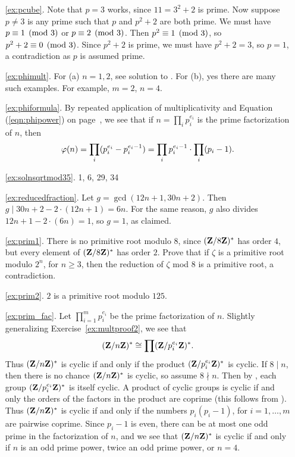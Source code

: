 \begin{itemize}
\begin{enumerate}
\item[\ref{ex:pcube}.]  Note that $p=3$ works, since $11=3^2+2$ is prime.
Now suppose $p\neq 3$ is any prime such that $p$ and $p^2+2$ are both prime.
We must have $p\equiv 1\pmod{3}$ or $p\equiv 2\pmod{3}$.
Then $p^2\equiv 1\pmod{3}$, so $p^2+2\equiv 0\pmod{3}$.
Since $p^2 + 2 $ is prime, we must have $p^2 + 2 = 3$, so $p=1$,
a contradiction as $p$ is assumed prime.

\item[\ref{ex:phimult}.]
For (a) $n=1,2$, see solution to .
For (b), yes there are many such examples.  For example, $m=2$, $n=4$.

\item[\ref{ex:phiformula}.]
By repeated application of multiplicativity and Equation (\ref{eqn:phipower})
on page~\pageref{eqn:phipower}, we see that if $n=\prod_i p_i^{e_i}$
is the prime factorization of $n$, then
$$
   \varphi(n) = \prod_i (p_i^{e_i} - p_i^{e_i-1})
   = \prod_i p_i^{e_i-1} \cdot \prod_i (p_i-1).
$$

\item[\ref{ex:solnsqrtmod35}.] 1, 6, 29, 34

\item[\ref{ex:reducedfraction}.]
Let $g=\gcd(12n+1,30n+2)$.   Then $g\mid 30n+2 - 2\cdot (12n+1) = 6n$.
 For the same reason, $g$ also divides
$12n+1 - 2\cdot (6n) = 1$, so $g=1$, as claimed.

\item[\ref{ex:prim1}.]  There is no primitive
root modulo $8$, since $(\mathbf{Z}/8\mathbf{Z}{})^*$ has order $4$,
but every element of $(\mathbf{Z}/8\mathbf{Z}{})^*$ has order $2$.
Prove that if $\zeta$ is a primitive root modulo $2^n$, for
$n\geq 3$, then the reduction of $\zeta$ mod $8$ is a primitive
root, a contradiction.

\item[\ref{ex:prim2}.] $2$ is a primitive root modulo $125$.


\item[\ref{ex:prim_fac}.] Let $\prod_{i=1}^m p_i^{e_i}$ be the prime
factorization of $n$.  Slightly
generalizing Exercise~\ref{ex:multproof2}, we see that
$$
  (\mathbf{Z}/n\mathbf{Z}{})^* \cong \prod (\mathbf{Z}/p_i^{e_i}\mathbf{Z}{})^*.
$$
Thus $(\mathbf{Z}/n\mathbf{Z}{})^*$ is cyclic if and only if the product
$(\mathbf{Z}/p_i^{e_i}\mathbf{Z}{})^*$ is cyclic.  If $8\mid n$, then
there is no chance $(\mathbf{Z}/n\mathbf{Z}{})^*$ is cyclic, so assume
$8\nmid n$.  Then by ,
each group $(\mathbf{Z}/p_i^{e_i}\mathbf{Z}{})^*$ is itself cyclic.
A product of cyclic groups is cyclic if and only
the orders of the factors in the product are coprime (this
follows from ).
Thus $(\mathbf{Z}/n\mathbf{Z}{})^*$ is cyclic if and only if the numbers
$p_i(p_i-1)$, for $i=1,\ldots, m$ are pairwise coprime.
Since $p_i-1$ is even, there can be at most one odd
prime in the factorization of $n$, and we see that
$(\mathbf{Z}/n\mathbf{Z}{})^*$ is cyclic if and only if $n$ is an odd
prime power, twice an odd prime power, or $n=4$.


\end{enumerate}
\end{itemize}
